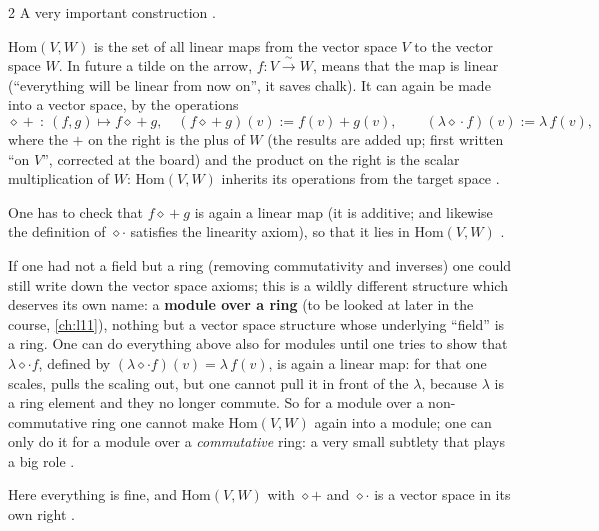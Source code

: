 \begin{paracol}{2}
A very important construction .
\begin{definition}\label{def:te-hom}
$\mathrm{Hom}(V,W)$ is the set of all linear maps from the vector space $V$ to the vector space $W$. In future a tilde on the arrow, $f\colon V\xrightarrow{\ \sim\ }W$, means that the map is linear (``everything will be linear from now on'', it saves chalk). It can again be made into a vector space, by
the operations
\[
  \diamond\!+\ \colon\ (f,g)\mapsto f\mathbin{\diamond\!+}g,\quad (f\mathbin{\diamond\!+}g)(v):=f(v)+g(v),\qquad (\lambda\mathbin{\diamond\!\cdot}f)(v):=\lambda\,f(v),
\]
where the $+$ on the right is the plus of $W$ (the results are added up; first written ``on $V$'', corrected at the board) and the product on the right is the scalar multiplication of $W$: $\mathrm{Hom}(V,W)$ inherits its operations from the target space
.
\end{definition}
One has to check that $f\mathbin{\diamond\!+}g$ is again a linear map (it is additive; and likewise the definition of $\diamond\cdot$ satisfies the linearity axiom), so that it lies in $\mathrm{Hom}(V,W)$ .

\begin{secondary}
If one had not a field but a ring (removing commutativity and inverses) one could still write down the vector space axioms; this is a wildly different structure which deserves its own name: a \textbf{module over a ring} (to be looked at later in the course, \cref{ch:l11}), nothing but a vector space structure whose underlying
``field'' is a ring. One can do everything above also for modules until one tries to show that $\lambda\diamond\cdot f$, defined by $(\lambda\diamond\cdot f)(v)=\lambda\,f(v)$, is again a linear map: for that one scales, pulls the scaling out, but one cannot pull it in front of the $\lambda$, because
$\lambda$ is a ring element and they no longer commute. So for a module over a non-commutative ring one cannot make $\mathrm{Hom}(V,W)$ again into a module; one can only do it for a module over a \emph{commutative} ring: a very small subtlety that plays a big role
.
\end{secondary}
Here everything is fine, and $\mathrm{Hom}(V,W)$ with $\diamond+$ and $\diamond\cdot$ is a vector space in its own right .


\end{paracol}
